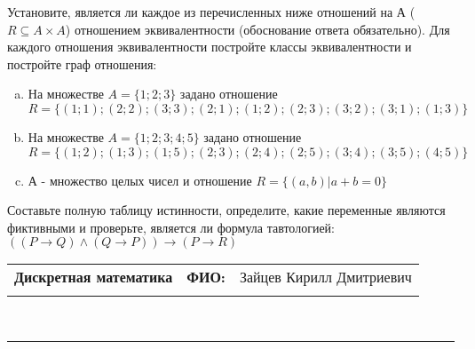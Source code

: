 \documentclass[10pt]{exam}
\newcommand{\class}{Дискретная математика}
\newcommand{\examdate}{}
\begin{document}
\begin{questions}
\question
Установите, является ли каждое из перечисленных ниже отношений на А ($R \subseteq A \times A$) отношением эквивалентности (обоснование ответа обязательно). Для каждого отношения эквивалентности постройте классы 
эквивалентности и постройте граф отношения:
\begin{enumerate} [a)]\setcounter{enumi}{0}
\item На множестве $A = \{1; 2; 3\}$ задано отношение $R = \{(1; 1); (2; 2); (3; 3); (2; 1); (1; 2); (2; 3); (3; 2); (3; 1); (1; 3)\}$
\item На множестве $A = \{1; 2; 3; 4; 5\}$ задано отношение $R = \{(1; 2); (1; 3); (1; 5); (2; 3); (2; 4); (2; 5); (3; 4); (3; 5); (4; 5)\}$
\item А - множество целых чисел и отношение $R = \{(a,b)|a + b = 0\}$
\end{enumerate}\question Составьте полную таблицу истинности, определите, какие переменные являются фиктивными и проверьте, является ли формула тавтологией:
$(( P \rightarrow Q) \land (Q \rightarrow P)) \rightarrow (P \rightarrow R)$

\end{questions}
\newpage
\begin{flushright}
\begin{tabular}{p{2.8in} r l}
\textbf{\class} & \textbf{ФИО:} &Зайцев Кирилл Дмитриевич
\\

\textbf{\examdate} &&\\
\end{tabular}\\
\end{flushright}
\rule[1ex]{\textwidth}{.1pt}
\end{document}
